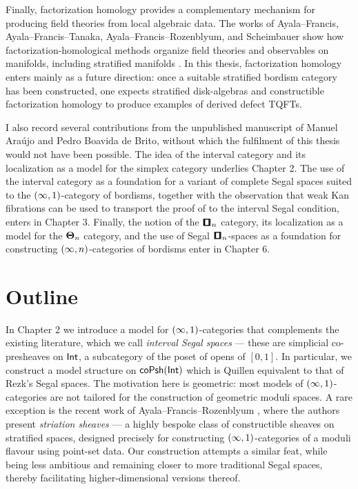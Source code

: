 Finally, factorization homology provides a complementary mechanism for producing field theories from local algebraic data. The works of Ayala--Francis, Ayala--Francis--Tanaka, Ayala--Francis--Rozenblyum, and Scheimbauer show how factorization-homological methods organize field theories and observables on manifolds, including stratified manifolds \cite{AF1,AF3,AFR2,Sch14}. In this thesis, factorization homology enters mainly as a future direction: once a suitable stratified bordism category has been constructed, one expects stratified disk-algebras and constructible factorization homology to produce examples of derived defect TQFTs.

I also record several contributions from the unpublished manuscript of Manuel Araújo and Pedro Boavida de Brito, without which the fulfilment of this thesis would not have been possible. The idea of the interval category and its localization as a model for the simplex category underlies Chapter 2. The use of the interval category as a foundation for a variant of complete Segal spaces suited to the $(\operatorname{\infty},1)$-category of bordisms, together with the observation that weak Kan fibrations can be used to transport the proof of \cite[Theorem 5.1]{BBEP24} to the interval Segal condition, enters in Chapter 3. Finally, the notion of the $\cube_n$ category, its localization as a model for the $\mathbf\Theta_n$ category, and the use of Segal $\cube_n$-spaces as a foundation for constructing $(\operatorname{\infty},n)$-categories of bordisms enter in Chapter 6.

\section*{Outline}

In Chapter 2 we introduce a model for $(\operatorname{\infty},1)$-categories that complements the existing literature, which we call \emph{interval Segal spaces} — these are simplicial co-presheaves on $\operatorname{\mathsf{Int}}$, a subcategory of the poset of opens of $[0,1]$. In particular, we construct a model structure on $\mathsf{coPsh}(\operatorname{\mathsf{Int}})$ which is Quillen equivalent to that of Rezk’s Segal spaces. The motivation here is geometric: most models of $(\operatorname{\infty},1)$-categories are not tailored for the construction of geometric moduli spaces. A rare exception is the recent work of Ayala--Francis--Rozenblyum \cite{AFR1}, where the authors present \emph{striation sheaves} — a highly bespoke class of constructible sheaves on stratified spaces, designed precisely for constructing $(\operatorname{\infty},1)$-categories of a moduli flavour using point-set data. Our construction attempts a similar feat, while being less ambitious and remaining closer to more traditional Segal spaces, thereby facilitating higher-dimensional versions thereof.

